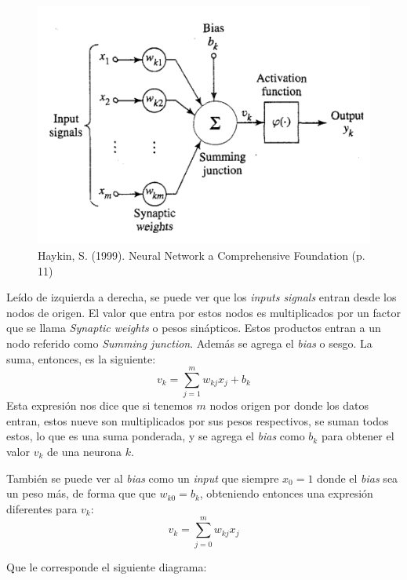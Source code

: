 \documentclass[14pt,a4paper]{report}
\begin{document}
\begin{figure}[h]
  \centering
  \includegraphics[scale=0.8]{../artificial-neural.png}
  \caption{Haykin, S. (1999). Neural Network a Comprehensive Foundation (p. 11)}
  \label{fig:neural-network}
\end{figure}

Leído de izquierda a derecha, se puede ver que los \textit{inputs signals} entran desde los nodos de origen. El valor que entra por estos nodos es multiplicados por un factor que se llama \textit{Synaptic weights} o pesos sinápticos. Estos productos entran a un nodo referido como \textit{Summing junction}. Además se agrega el \textit{bias} o sesgo. La suma, entonces, es la siguiente:
$$
v_k = \sum_{j=1}^{m} w_{kj}x_{j}+b_{k}
$$
Esta expresión nos dice que si tenemos $m$ nodos origen por donde los datos entran, estos nueve son multiplicados por sus pesos respectivos, se suman todos estos, lo que es una suma ponderada, y se agrega el \textit{bias} como $b_{k}$ para obtener el valor $v_{k}$ de una neurona $k$.

También se puede ver al \textit{bias} como un \textit{input} que siempre $x_{0} = 1$ donde el \textit{bias} sea un peso más, de forma que que $w_{k0}=b_k$, obteniendo entonces una expresión diferentes para $v_k$:
$$
v_k = \sum_{j=0}^{m} w_{kj}x_{j}
$$

Que le corresponde el siguiente diagrama:
\end{document}
